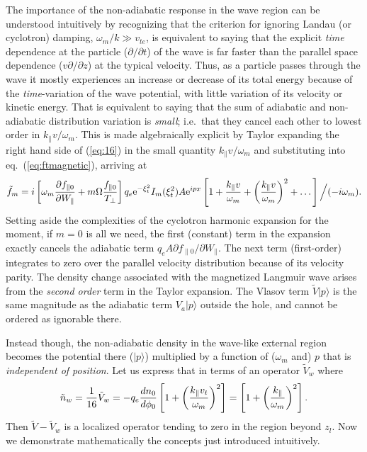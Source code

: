 \documentclass[12pt]{article}
\def\ket#1{|#1\rangle}
\begin{document}
The importance of the non-adiabatic response in the wave region can be
understood intuitively by recognizing that the criterion for ignoring
Landau (or cyclotron) damping, $\omega_m/k\gg v_{te}$, is equivalent
to saying that the explicit \emph{time} dependence at the particle
($\partial/\partial t$) of the wave is far faster than the parallel
space dependence ($v\partial/\partial z$) at the typical
velocity. Thus, as a particle passes through the wave it mostly
experiences an increase or decrease of its total energy because of the
\emph{time}-variation of the wave potential, with little variation of
its velocity or kinetic energy. That is equivalent to saying that the
sum of adiabatic and non-adiabatic distribution variation is
\emph{small}; i.e.\ that they cancel each other to lowest order in
$k_\parallel v/\omega_m$. This is made algebraically explicit by
Taylor expanding the right hand side of (\ref{eq:16}) in the small
quantity $k_\parallel v/\omega_m$ and substituting into eq.\
(\ref{eq:ftmagnetic}), arriving at
\begin{equation}
  \label{eq:17}
  \tilde f_m = i\left[\omega_m
    {\partial f_{\parallel0}\over \partial W_\parallel}
    +m\Omega {f_{\parallel0}\over T_\perp}\right]
  q_e{\rm e}^{-\xi_t^2}I_m(\xi_t^2) A{\rm e}^{ipx}
  \left[1+{k_\parallel v\over\omega_m}+
    \left({k_\parallel v\over\omega_m}\right)^2+\dots\right]
  \Big/(-i\omega_m).
\end{equation}
Setting aside the complexities of the cyclotron harmonic expansion
for the moment, if $m=0$ is all we need, the first (constant) term in
the expansion exactly cancels the adiabatic term
$q_eA{\partial f_{\parallel0}/\partial W_\parallel}$. The next
term (first-order) integrates to zero over the parallel velocity
distribution because of its velocity parity. The density change
associated with the magnetized Langmuir wave arises from the
\emph{second order} term in the Taylor expansion. The Vlasov term
$\tilde{V}\ket{p}$ is the same magnitude as the adiabatic term $V_a\ket{p}$
outside the hole, and cannot be ordered as ignorable there.

Instead though, the non-adiabatic density in the wave-like external region
becomes the potential there ($\ket{p}$) multiplied by a function of
($\omega_m$ and) $p$ that is \emph{independent of position}. Let us
express that in terms of an operator $\tilde{V}_{w}$ where
\begin{equation}
  \label{eq:20}
\tilde n_{w}={1\over16}\tilde{V}_{w}=-q_e{dn_0\over d\phi_0}\left[1+\left(k_\parallel v_t\over\omega_m\right)^2\right]=\left[1+\left(k_\parallel\over\omega_m\right)^2\right].  
\end{equation}
 Then
$\tilde{V}-\tilde{V}_{w}$ is a localized operator tending to zero in
the region beyond $z_l$. Now we demonstrate mathematically the concepts
just introduced intuitively.
\end{document}
